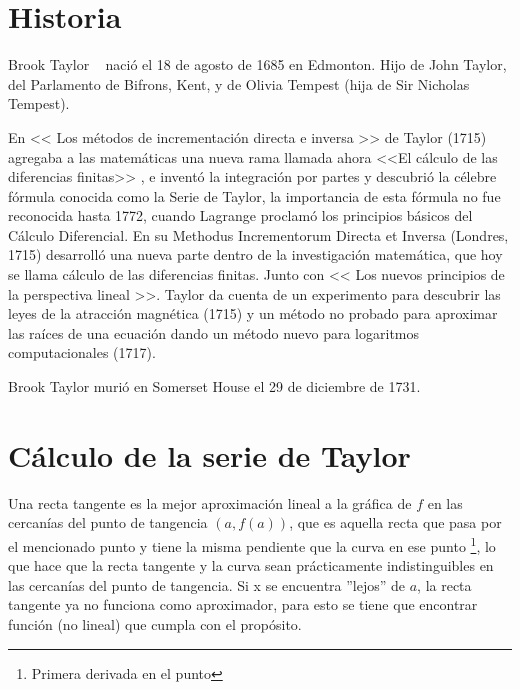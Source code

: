 

\section{Historia}
\label{2:sec:1}
  Brook Taylor ~\cite{URL:XML1} naci\'o el 18 de agosto de 1685 en Edmonton. Hijo de John Taylor,
del Parlamento de Bifrons, Kent, y de Olivia Tempest (hija de Sir Nicholas Tempest).

  En << Los m\'etodos de incrementaci\'on directa e inversa >> de Taylor (1715) agregaba a las
matem\'aticas una nueva rama llamada ahora <<El c\'alculo de las diferencias finitas>> ,
e invent\'o la integraci\'on por partes y descubri\'o la c\'elebre f\'ormula conocida como la Serie de Taylor,
la importancia de esta f\'ormula no fue reconocida hasta 1772, cuando Lagrange proclam\'o los
principios b\'asicos del C\'alculo Diferencial. En su Methodus Incrementorum Directa et Inversa
(Londres, 1715) desarroll\'o una nueva parte dentro de la investigaci\'on matem\'atica,
que hoy se llama c\'alculo de las diferencias finitas. Junto con << Los nuevos principios de
la perspectiva lineal >>. Taylor da cuenta de un experimento para descubrir las leyes de la
atracci\'on magn\'etica (1715) y un m\'etodo no probado para aproximar las ra\'ices de una ecuaci\'on
dando un m\'etodo nuevo para logaritmos computacionales (1717).

  Brook Taylor muri\'o en Somerset House el 29 de diciembre de 1731.

\section{C\'alculo de la serie de Taylor}
\label{2:sec:2}

  Una recta tangente es la mejor aproximaci\'on lineal a la gr\'afica de $f$ en las cercan\'ias del punto de tangencia $(a, f(a))$, que es aquella recta que pasa
por el mencionado punto y tiene la misma pendiente que la curva en ese punto \footnote{Primera derivada en el punto}, lo que hace que la recta tangente y la curva sean pr\'acticamente
indistinguibles en las cercan\'ias del punto de tangencia. Si x se encuentra ''lejos'' de $a$, la recta tangente ya no funciona como aproximador, para esto se tiene que encontrar funci\'on
(no lineal) que cumpla con el prop\'osito.

